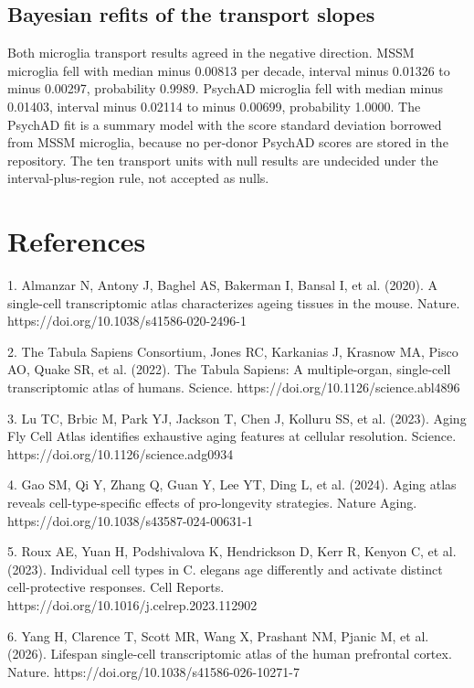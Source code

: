 \documentclass[11pt]{article}
\begin{document}
\subsection*{Bayesian refits of the transport slopes}

Both microglia transport results agreed in the negative direction. MSSM microglia fell with median minus 0.00813 per decade, interval minus 0.01326 to minus 0.00297, probability 0.9989. PsychAD microglia fell with median minus 0.01403, interval minus 0.02114 to minus 0.00699, probability 1.0000. The PsychAD fit is a summary model with the score standard deviation borrowed from MSSM microglia, because no per-donor PsychAD scores are stored in the repository. The ten transport units with null results are undecided under the interval-plus-region rule, not accepted as nulls.

\section*{References}

1. Almanzar N, Antony J, Baghel AS, Bakerman I, Bansal I, et al. (2020). A single-cell transcriptomic atlas characterizes ageing tissues in the mouse. Nature. https://doi.org/10.1038/s41586-020-2496-1

2. The Tabula Sapiens Consortium, Jones RC, Karkanias J, Krasnow MA, Pisco AO, Quake SR, et al. (2022). The Tabula Sapiens: A multiple-organ, single-cell transcriptomic atlas of humans. Science. https://doi.org/10.1126/science.abl4896

3. Lu TC, Brbic M, Park YJ, Jackson T, Chen J, Kolluru SS, et al. (2023). Aging Fly Cell Atlas identifies exhaustive aging features at cellular resolution. Science. https://doi.org/10.1126/science.adg0934

4. Gao SM, Qi Y, Zhang Q, Guan Y, Lee YT, Ding L, et al. (2024). Aging atlas reveals cell-type-specific effects of pro-longevity strategies. Nature Aging. https://doi.org/10.1038/s43587-024-00631-1

5. Roux AE, Yuan H, Podshivalova K, Hendrickson D, Kerr R, Kenyon C, et al. (2023). Individual cell types in C. elegans age differently and activate distinct cell-protective responses. Cell Reports. https://doi.org/10.1016/j.celrep.2023.112902




6. Yang H, Clarence T, Scott MR, Wang X, Prashant NM, Pjanic M, et al. (2026). Lifespan single-cell transcriptomic atlas of the human prefrontal cortex. Nature. https://doi.org/10.1038/s41586-026-10271-7
\end{document}
